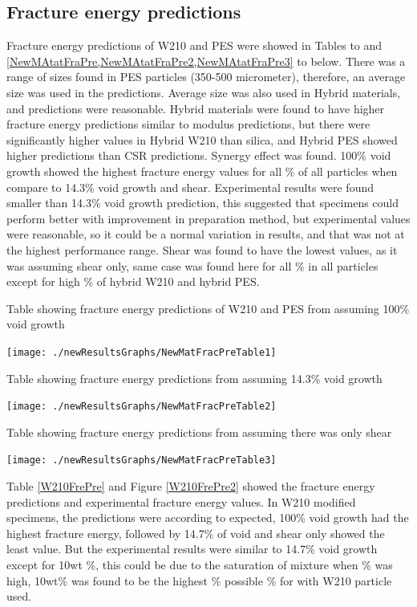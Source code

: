 \documentclass[numbers=noendperiod,chapterprefix=on]{icldt} %
\begin{document}
{\subsection{Fracture energy predictions}
Fracture energy predictions of W210 and PES were showed in Tables to and  \ref{NewMAtatFraPre,NewMAtatFraPre2,NewMAtatFraPre3} to below. There was a range of sizes found in PES particles (350-500 micrometer), therefore, an average size was used in the predictions. Average size was also used in Hybrid materials, and predictions were reasonable. Hybrid materials were found to have higher fracture energy predictions similar to modulus predictions, but there were significantly higher values in Hybrid W210 than silica, and Hybrid PES showed higher predictions than CSR predictions. Synergy effect was found. 100\% void growth showed the highest fracture energy values for all \% of all particles when compare to 14.3\% void growth and shear. Experimental results were found smaller than 14.3\% void growth prediction, this suggested that specimens could perform better with improvement in preparation method, but experimental values were reasonable, so it could be a normal variation in results, and that was not at the highest performance range. Shear was found to have the lowest values, as it was assuming shear only, same case was found here for all \% in all particles except for high \% of hybrid W210 and hybrid PES. 

\begin{table}[!hp]
\centering
\caption{Table showing fracture energy predictions of W210 and PES from assuming 100\% void growth} \label{NewMAtatFraPre}
\texttt{[image: ./newResultsGraphs/NewMatFracPreTable1]}
\end{table}
\FloatBarrier

\begin{table}[!htpb]
\centering
\caption{Table showing fracture energy predictions from assuming 14.3\% void growth} \label{NewMAtatFraPre2}
\texttt{[image: ./newResultsGraphs/NewMatFracPreTable2]}
\end{table}
\FloatBarrier

\begin{table}[!htpb]
\centering
\caption{Table showing fracture energy predictions from assuming there was only shear} \label{NewMAtatFraPre3}
\texttt{[image: ./newResultsGraphs/NewMatFracPreTable3]}
\end{table}
\FloatBarrier

Table \ref{W210FrePre} and Figure \ref{W210FrePre2} showed the fracture energy predictions and experimental fracture energy values. In W210 modified specimens, the predictions were according to expected, 100\% void growth had the highest fracture energy, followed by 14.7\% of void and shear only showed the least value. But the experimental results were similar to 14.7\% void growth except for 10wt \%, this could be due to the saturation of mixture when \% was high, 10wt\% was found to be the highest \% possible \% for with W210 particle used.  

}
\end{document}

